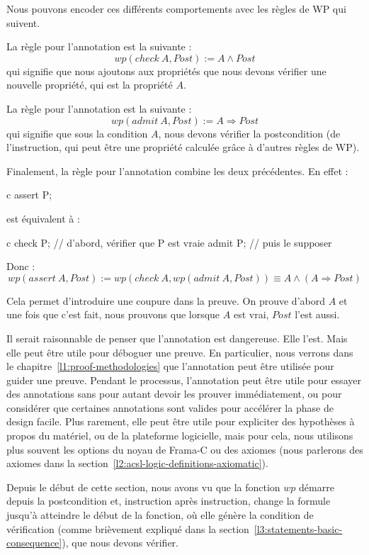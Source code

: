 Nous pouvons encoder ces différents comportements avec les règles de WP qui
suivent.


La règle pour l'annotation  est la suivante :
$$ wp(check\ A, Post) := A \wedge Post $$
qui signifie que nous ajoutons aux propriétés que nous devons vérifier une
nouvelle propriété, qui est la propriété $A$.


La règle pour l'annotation  est la suivante :
$$ wp(admit\ A, Post) := A \Rightarrow Post $$
qui signifie que sous la condition $A$, nous devons vérifier la postcondition
(de l'instruction, qui peut être une propriété calculée grâce à d'autres règles
de WP).


Finalement, la règle pour l'annotation  combine les deux
précédentes. En effet :
\begin{CodeBlock}{c}
  assert P;
\end{CodeBlock}
est équivalent à :
\begin{CodeBlock}{c}
  check P; // d'abord, vérifier que P est vraie
  admit P; // puis le supposer
\end{CodeBlock}
Donc :
$$ wp(assert\ A, Post) := wp(check\ A, wp(admit\ A, Post)) \equiv A \wedge (A \Rightarrow Post) $$


Cela permet d'introduire une coupure dans la preuve. On prouve d'abord $A$ et
une fois que c'est fait, nous prouvons que lorsque $A$ est vrai, $Post$ l'est
aussi.


Il serait raisonnable de penser que l'annotation  est
dangereuse. Elle l'est. Mais elle peut être utile pour déboguer une preuve.
En particulier, nous verrons dans le chapitre~\ref{l1:proof-methodologies} que
l'annotation  peut être utilisée pour guider une preuve.
Pendant le processus, l'annotation  peut être utile pour
essayer des annotations sans pour autant devoir les prouver immédiatement, ou
pour considérer que certaines annotations sont valides pour accélérer la phase
de design facile. Plus rarement, elle peut être utile pour expliciter des
hypothèses à propos du matériel, ou de la plateforme logicielle, mais pour cela,
nous utilisons plus souvent les options du noyau de Frama-C ou des axiomes
(nous parlerons des axiomes dans la section~\ref{l2:acsl-logic-definitions-axiomatic}).




Depuis le début de cette section, nous avons vu que la fonction $wp$ démarre
depuis la postcondition et, instruction après instruction, change la formule
jusqu'à atteindre le début de la fonction, où elle génère la condition de
vérification (comme brièvement expliqué dans la
section~\ref{l3:statements-basic-consequence}), que nous devons vérifier.


